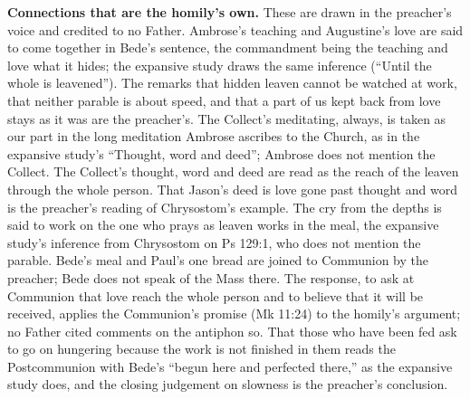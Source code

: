 {\textbf{Connections that are the homily's own.} These are drawn in the
preacher's voice and credited to no Father. Ambrose's teaching and
Augustine's love are said to come together in Bede's sentence, the commandment
being the teaching and love what it hides; the expansive study draws the same
inference (``Until the whole is leavened''). The remarks that hidden leaven
cannot be watched at work, that neither parable is about speed, and that a
part of us kept back from love stays as it was are the preacher's. The
Collect's meditating, always, is taken as our part in the long meditation
Ambrose ascribes to the Church, as in the expansive study's ``Thought, word
and deed''; Ambrose does not mention the Collect. The Collect's thought, word
and deed are read as the reach of the leaven through the whole person. That
Jason's deed is love gone past thought and word is the preacher's reading of
Chrysostom's example. The cry from the depths is said to work on the one who
prays as leaven works in the meal, the expansive study's inference from
Chrysostom on Ps 129:1, who does not mention the parable. Bede's meal and
Paul's one bread are joined to Communion by the preacher; Bede does not speak
of the Mass there. The response, to ask at Communion that love reach the whole
person and to believe that it will be received, applies the Communion's
promise (Mk 11:24) to the homily's argument; no Father cited comments on the
antiphon so. That those who have been fed ask to go on hungering because the
work is not finished in them reads the Postcommunion with Bede's ``begun here
and perfected there,'' as the expansive study does, and the closing judgement
on slowness is the preacher's conclusion.

}

